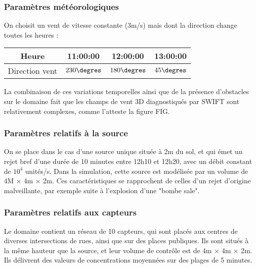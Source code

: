 
\subsubsection{Paramètres météorologiques}

On choisit un vent de vitesse constante (3m/s) mais dont la direction change toutes les heures : \\

\begin{center}
\begin{tabular}{cccc}
	\centering
	Heure & 11:00:00 &  12:00:00 &  13:00:00\\ 
	\hline
	 Direction vent & $230\degres$ & $180\degres$ & $45\degres$
\end{tabular} 
\end{center}

La combinaison de ces variations temporelles ainsi que de la présence d'obstacles sur le domaine fait que les champs de vent 3D diagnostiqués par SWIFT sont relativement complexes, comme l'atteste la figure FIG.


\subsubsection{Paramètres relatifs à la source}

On se place dans le cas d'une source unique située à 2m du sol, et qui émet un rejet bref d'une durée de 10 minutes entre 12h10 et 12h20, avec un débit constant de $10^4$ unités/s. Dans la simulation, cette source est modélisée par un volume de 4M $\times$ 4m $\times$ 2m. Ces caractéristiques se rapprochent de celles d'un rejet d'origine malveillante, par exemple suite à l'explosion d'une "bombe sale". \\


\subsubsection{Paramètres relatifs aux capteurs}

Le domaine contient un réseau de 10 capteurs, qui sont placés aux centres de diverses intersections de rues, ainsi que sur des places publiques. Ils sont situés à la même hauteur que la source, et leur volume de contrôle est de 4m $\times$ 4m $\times$ 2m. Ils délivrent des valeurs de concentrations moyennées sur des plages de 5 minutes. \\

